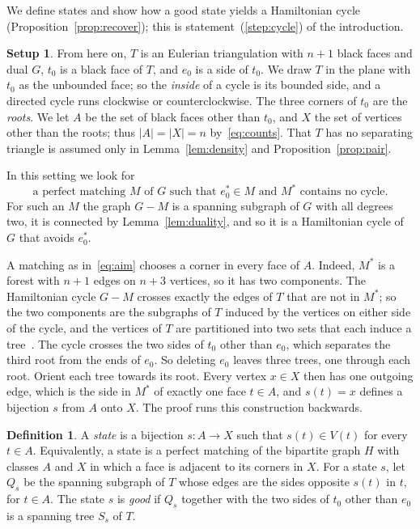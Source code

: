 \documentclass[a4paper]{amsart}
\numberwithin{equation}{section}
\theoremstyle{definition}
\newtheorem{definition}[equation]{Definition}
\newtheorem{setup}[equation]{Setup}
\begin{document}
We define states and show how a good state yields a Hamiltonian cycle (Proposition~\ref{prop:recover}); this is statement~(\ref{step:cycle}) of the introduction.

\begin{setup}\label{setup}
From here on, $T$ is an Eulerian triangulation with $n+1$ black faces and dual $G$, $t_0$ is a black face of $T$, and $e_0$ is a side of $t_0$.
We draw $T$ in the plane with $t_0$ as the unbounded face; so the \emph{inside} of a cycle is its bounded side, and a directed cycle runs clockwise or counterclockwise.
The three corners of $t_0$ are the \emph{roots}.
We let $A$ be the set of black faces other than $t_0$, and $X$ the set of vertices other than the roots; thus $|A|=|X|=n$ by~\eqref{eq:counts}.
That $T$ has no separating triangle is assumed only in Lemma~\ref{lem:density} and Proposition~\ref{prop:pair}.
\end{setup}

In this setting we look for
\begin{equation}\label{eq:aim}
\text{a perfect matching $M$ of $G$ such that $e_0^*\in M$ and $M^*$ contains no cycle.}
\end{equation}
For such an $M$ the graph $G-M$ is a spanning subgraph of $G$ with all degrees two, it is connected by Lemma~\ref{lem:duality}, and so it is a Hamiltonian cycle of $G$ that avoids $e_0^*$.

A matching as in~\eqref{eq:aim} chooses a corner in every face of $A$.
Indeed, $M^*$ is a forest with $n+1$ edges on $n+3$ vertices, so it has two components.
The Hamiltonian cycle $G-M$ crosses exactly the edges of $T$ that are not in $M^*$; so the two components are the subgraphs of $T$ induced by the vertices on either side of the cycle, and the vertices of $T$ are partitioned into two sets that each induce a tree~\cite[Theorem~2.2]{Stein}.
The cycle crosses the two sides of $t_0$ other than $e_0$, which separates the third root from the ends of $e_0$.
So deleting $e_0$ leaves three trees, one through each root.
Orient each tree towards its root.
Every vertex $x\in X$ then has one outgoing edge, which is the side in $M^*$ of exactly one face $t\in A$, and $s(t)=x$ defines a bijection $s$ from $A$ onto $X$.
The proof runs this construction backwards.

\begin{definition}\label{def:state}
A \emph{state} is a bijection $s\colon A\to X$ such that $s(t)\in V(t)$ for every $t\in A$.
Equivalently, a state is a perfect matching of the bipartite graph $H$ with classes $A$ and $X$ in which a face is adjacent to its corners in $X$.
For a state $s$, let $Q_s$ be the spanning subgraph of $T$ whose edges are the sides opposite $s(t)$ in $t$, for $t\in A$.
The state $s$ is \emph{good} if $Q_s$ together with the two sides of $t_0$ other than $e_0$ is a spanning tree $S_s$ of $T$.
\end{definition}
\end{document}
